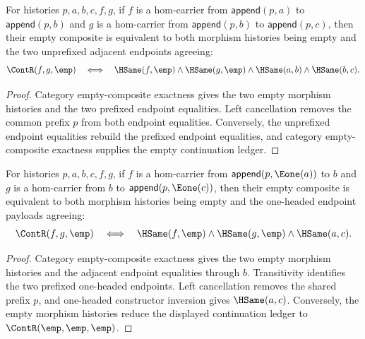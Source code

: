 \begin{theorem}
\label{thm:functor-prefix-hom-carrier-comp-empty-iff}
For histories $p,a,b,c,f,g$, if $f$ is a hom-carrier from
$\mathsf{append}(p,a)$ to $\mathsf{append}(p,b)$ and $g$ is a hom-carrier from
$\mathsf{append}(p,b)$ to $\mathsf{append}(p,c)$, then their empty composite is
equivalent to both morphism histories being empty and the two unprefixed
adjacent endpoints agreeing:
$$
\ContR(f,g,\emp)
\quad\Longleftrightarrow\quad
\HSame(f,\emp)\wedge\HSame(g,\emp)\wedge\HSame(a,b)\wedge\HSame(b,c).
$$
\end{theorem}
\begin{proof}
Category empty-composite exactness gives the two empty morphism histories and
the two prefixed endpoint equalities. Left cancellation removes the common
prefix $p$ from both endpoint equalities. Conversely, the unprefixed endpoint
equalities rebuild the prefixed endpoint equalities, and category
empty-composite exactness supplies the empty continuation ledger.
\end{proof}

\begin{theorem}
\label{thm:functor-prefix-hom-carrier-e1-endpoint-empty-composite-iff}
For histories $p,a,b,c,f,g$, if $f$ is a hom-carrier from
$\mathsf{append}(p,\Eone(a))$ to $b$ and $g$ is a hom-carrier from $b$ to
$\mathsf{append}(p,\Eone(c))$, then their empty composite is equivalent to
both morphism histories being empty and the one-headed endpoint payloads
agreeing:
$$
\ContR(f,g,\emp)
\quad\Longleftrightarrow\quad
\HSame(f,\emp)\wedge\HSame(g,\emp)\wedge\HSame(a,c).
$$
\end{theorem}
\begin{proof}
Category empty-composite exactness gives the two empty morphism histories and
the adjacent endpoint equalities through $b$. Transitivity identifies the two
prefixed one-headed endpoints. Left cancellation removes the shared prefix
$p$, and one-headed constructor inversion gives $\HSame(a,c)$. Conversely, the
empty morphism histories reduce the displayed continuation ledger to
$\ContR(\emp,\emp,\emp)$.
\end{proof}

